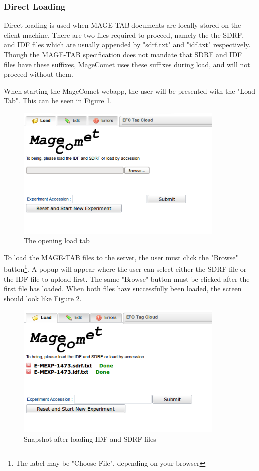 \documentclass[a4paper]{article}
\begin{document}
\subsubsection{Direct Loading}
Direct loading is used when MAGE-TAB documents are locally stored on the client machine. There are two files required to proceed, namely the the SDRF, and IDF files which are usually appended by "sdrf.txt" and "idf.txt" respectively. Though the MAGE-TAB specification does not mandate that SDRF and IDF files have these suffixes, MageComet uses these suffixes during load, and will not proceed without them.

When starting the MageComet webapp, the user will be presented with the "Load Tab". This can be seen in Figure \ref{initial}.

\begin{figure}[h]
\caption{The opening load tab}
\centering
\label{initial}
\includegraphics[width=10cm]{images/Load}
\end{figure}

To load the MAGE-TAB files to the server, the user must click the "Browse" button\footnote{The label may be "Choose File", depending on your browser}. A popup will appear where the user can select either the SDRF file or the IDF file to upload first. The same "Browse" button must be clicked after the first file has loaded. When both files have successfully been loaded, the screen should look like Figure \ref{load2}.

\begin{figure}[h]
\caption{Snapshot after loading IDF and SDRF files}
\centering
\label{load2}
\includegraphics[width=10cm]{images/Load2}
\end{figure}
\end{document}
